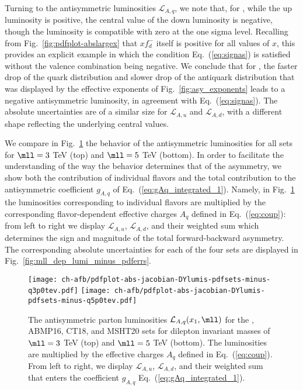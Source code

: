 Turning to the antisymmetric \pdf luminosities $\mathcal{L}_{A,q}$,
we note  that, for , while the up luminosity is
positive, the central value of the down luminosity is negative, though
the luminosity is compatible with zero at the one sigma level.
%
Recalling
from Fig.~\ref{fig:pdfplot-abslargex} that $xf_{d}^-$ itself is
positive for all values of $x$,  this provides an explicit example in
which the condition Eq.~(\ref{eq:signas}) is satisfied without the valence
combination being negative.
%
We conclude that for , the faster
drop of the quark distribution and slower drop of the antiquark
distribution that was displayed by the effective exponents of
Fig.~\ref{fig:asy_exponents} leads to a negative antisymmetric
luminosity, in agreement with Eq.~(\ref{eq:signas}).
The absolute \pdf uncertainties are of a similar size for
$\mathcal{L}_{A,u}$ and $\mathcal{L}_{A,d}$, with a different shape
reflecting the underlying central values.

We compare
in Fig.~\ref{fig:mll_dep_lumi_minus}
the behavior of the antisymmetric luminosities for all \pdf
sets for $\mll=3$ TeV (top) and $\mll=5$ TeV (bottom).
%
In order to facilitate the understanding of the way the \pdf behavior
determines that of the asymmetry, we show both the contribution of
individual flavors and the total contribution
to the antisymmetric coefficient $g_{A,q}$ of
Eq.~(\ref{eq:gAq_integrated_1}). Namely, in
Fig.~\ref{fig:mll_dep_lumi_minus} the luminosities corresponding to
individual flavors are multiplied by the corresponding flavor-dependent
effective charges $A_q$ defined in Eq.~(\ref{eq:coup}):
from left to right we display $\mathcal{L}_{A,u}$,  $\mathcal{L}_{A,d}$,
and their weighted sum
 which determines
the sign and magnitude of the total forward-backward asymmetry.
%
The corresponding absolute \pdf uncertainties for each of the four \pdf sets
are displayed in  Fig.~\ref{fig:mll_dep_lumi_minus_pdferrs}.

\begin{figure}[!t]
 \centering
 \texttt{[image: ch-afb/pdfplot-abs-jacobian-DYlumis-pdfsets-minus-q3p0tev.pdf]}
 \texttt{[image: ch-afb/pdfplot-abs-jacobian-DYlumis-pdfsets-minus-q5p0tev.pdf]}
 \caption{The antisymmetric 
   parton luminosities $\mathcal{L}_{A,q}(x_1,\mll)$ for the , ABMP16,
   CT18, and MSHT20 \nnlo \pdf sets for dilepton
   invariant masses of
   $\mll=3$ TeV (top) and $\mll=5$ TeV (bottom).
   The luminosities are multiplied by the effective charges
   $A_q$ defined in Eq.~(\ref{eq:coup}).
   From left to right, we display $\mathcal{L}_{A,u}$,  $\mathcal{L}_{A,d}$,
   and their weighted sum that enters the  coefficient $g_{A,q}$ Eq.~(\ref{eq:gAq_integrated_1}).
    }    
 \label{fig:mll_dep_lumi_minus}
\end{figure}

